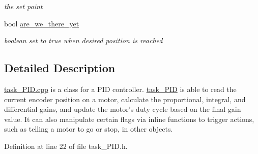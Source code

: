 \begin{DoxyCompactItemize}
\begin{DoxyCompactList}\small\item\em the set point \end{DoxyCompactList}\item 
\hypertarget{classtask__PID_a9d046f072b58189aed139ea63d853fd4}{bool \hyperlink{classtask__PID_a9d046f072b58189aed139ea63d853fd4}{are\-\_\-we\-\_\-there\-\_\-yet}}\label{classtask__PID_a9d046f072b58189aed139ea63d853fd4}

\begin{DoxyCompactList}\small\item\em boolean set to true when desired position is reached \end{DoxyCompactList}\end{DoxyCompactItemize}


\subsection{Detailed Description}
\hyperlink{task__PID_8cpp}{task\-\_\-\-P\-I\-D.\-cpp} is a class for a P\-I\-D controller. \hyperlink{classtask__PID}{task\-\_\-\-P\-I\-D} is able to read the current encoder position on a motor, calculate the proportional, integral, and differential gains, and update the motor's duty cycle based on the final gain value. It can also manipulate certain flags via inline functions to trigger actions, such as telling a motor to go or stop, in other objects. 

Definition at line 22 of file task\-\_\-\-P\-I\-D.\-h.



